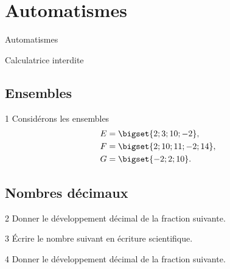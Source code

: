 
\AdvanceDate[3]



\section{Automatismes}

\begin{frame}

\centering \huge
Automatismes

\large
Calculatrice interdite

\end{frame}

\subsection{Ensembles}

\begin{frame}{1\vspace{-32pt}}
	Considérons les ensembles 
		\begin{align*}
			E &= \bigset{ 2 ; 3 ; 10 ; -2}, \\
			F &= \bigset{2 ; 10 ; 11 ; -2 ; 14}, \\
			G &= \bigset{ -2 ; 2 ; 10}.
		\end{align*}
	\vspace{-10pt}
\end{frame}

\subsection{Nombres décimaux}

\begin{frame}{2\vspace{-32pt}}
	Donner le développement décimal de la fraction suivante.
\end{frame}

\begin{frame}{3\vspace{-32pt}}
	Écrire le nombre suivant en écriture scientifique.
	\vspace{-10pt}
\end{frame}


\begin{frame}{4\vspace{-32pt}}
	Donner le développement décimal de la fraction suivante.
\end{frame}
